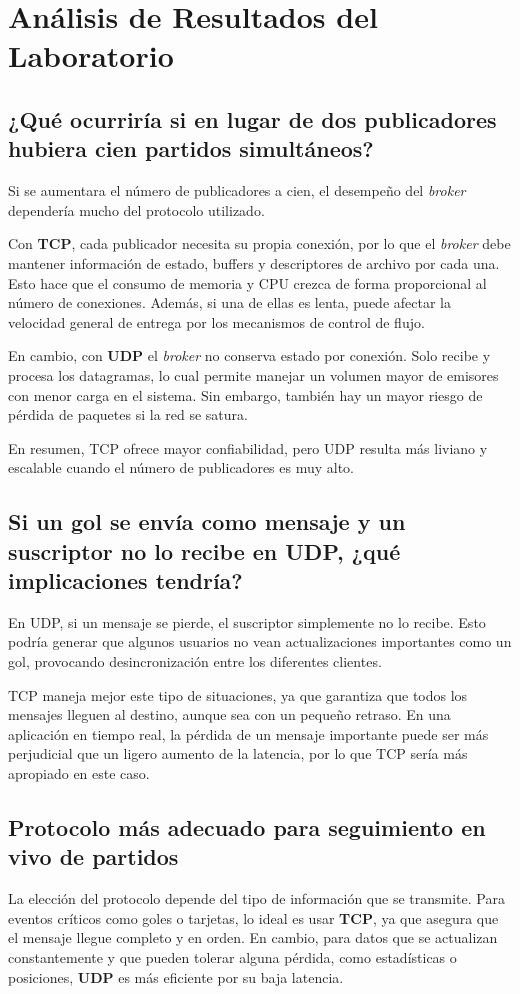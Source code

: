 \documentclass[10pt]{article}
\begin{document}
\section{Análisis de Resultados del Laboratorio}

\subsection{¿Qué ocurriría si en lugar de dos publicadores hubiera cien partidos simultáneos?}
Si se aumentara el número de publicadores a cien, el desempeño del \textit{broker} dependería mucho del protocolo utilizado. 

Con \textbf{TCP}, cada publicador necesita su propia conexión, por lo que el \textit{broker} debe mantener información de estado, buffers y descriptores de archivo por cada una. Esto hace que el consumo de memoria y CPU crezca de forma proporcional al número de conexiones. Además, si una de ellas es lenta, puede afectar la velocidad general de entrega por los mecanismos de control de flujo.

En cambio, con \textbf{UDP} el \textit{broker} no conserva estado por conexión. Solo recibe y procesa los datagramas, lo cual permite manejar un volumen mayor de emisores con menor carga en el sistema. Sin embargo, también hay un mayor riesgo de pérdida de paquetes si la red se satura.

En resumen, TCP ofrece mayor confiabilidad, pero UDP resulta más liviano y escalable cuando el número de publicadores es muy alto.

\subsection{Si un gol se envía como mensaje y un suscriptor no lo recibe en UDP, ¿qué implicaciones tendría?}
En UDP, si un mensaje se pierde, el suscriptor simplemente no lo recibe. Esto podría generar que algunos usuarios no vean actualizaciones importantes como un gol, provocando desincronización entre los diferentes clientes.

TCP maneja mejor este tipo de situaciones, ya que garantiza que todos los mensajes lleguen al destino, aunque sea con un pequeño retraso. En una aplicación en tiempo real, la pérdida de un mensaje importante puede ser más perjudicial que un ligero aumento de la latencia, por lo que TCP sería más apropiado en este caso.

\subsection{Protocolo más adecuado para seguimiento en vivo de partidos}
La elección del protocolo depende del tipo de información que se transmite. Para eventos críticos como goles o tarjetas, lo ideal es usar \textbf{TCP}, ya que asegura que el mensaje llegue completo y en orden. En cambio, para datos que se actualizan constantemente y que pueden tolerar alguna pérdida, como estadísticas o posiciones, \textbf{UDP} es más eficiente por su baja latencia.
\end{document}
